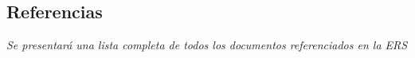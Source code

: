 \subsection{Referencias}
\par \emph{Se    presentará  una  lista  completa  de  todos  los  documentos  referenciados  en  la ERS}

